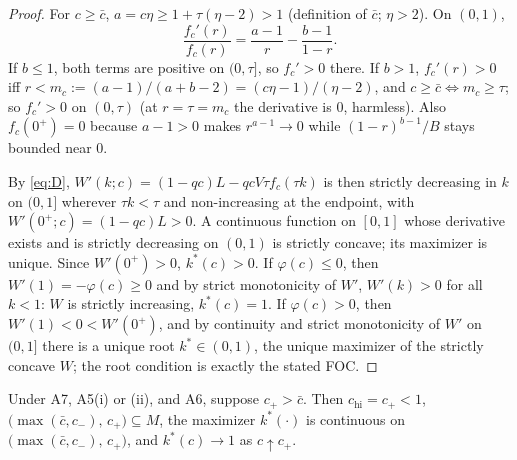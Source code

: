 \begin{proof}
For $c \ge \bar c$, $a = c\eta \ge 1 + \tau(\eta - 2) > 1$ (definition of $\bar c$;
$\eta > 2$). On $(0,1)$,
\[
\frac{f_c'(r)}{f_c(r)} = \frac{a - 1}{r} - \frac{b - 1}{1 - r}.
\]
If $b \le 1$, both terms are positive on $(0, \tau]$, so $f_c' > 0$ there. If $b > 1$,
$f_c'(r) > 0$ iff $r < m_c := (a - 1)/(a + b - 2) = (c\eta - 1)/(\eta - 2)$, and
$c \ge \bar c \iff m_c \ge \tau$; so $f_c' > 0$ on $(0, \tau)$ (at $r = \tau = m_c$ the
derivative is $0$, harmless). Also $f_c(0^+) = 0$ because $a - 1 > 0$ makes
$r^{a-1} \to 0$ while $(1 - r)^{b-1}/B$ stays bounded near $0$.

By \eqref{eq:D}, $W'(k; c) = (1 - qc)L - qcV\tau f_c(\tau k)$ is then strictly
decreasing in $k$ on $(0,1]$ wherever $\tau k < \tau$ and non-increasing at the
endpoint, with $W'(0^+; c) = (1 - qc)L > 0$. A continuous function on $[0,1]$ whose
derivative exists and is strictly decreasing on $(0,1)$ is strictly concave; its
maximizer is unique. Since $W'(0^+) > 0$, $k^*(c) > 0$. If $\varphi(c) \le 0$, then
$W'(1) = -\varphi(c) \ge 0$ and by strict monotonicity of $W'$, $W'(k) > 0$ for all
$k < 1$: $W$ is strictly increasing, $k^*(c) = 1$. If $\varphi(c) > 0$, then
$W'(1) < 0 < W'(0^+)$, and by continuity and strict monotonicity of $W'$ on $(0,1]$
there is a unique root $k^* \in (0,1)$, the unique maximizer of the strictly concave
$W$; the root condition is exactly the stated FOC.
\end{proof}

\begin{lemma}
\label{lem:upper}
Under A7, A5(i) or (ii), and A6, suppose $c_+ > \bar c$. Then
$c_{\mathrm{hi}} = c_+ < 1$, $\bigl( \max(\bar c, c_-),\, c_+ \bigr) \subseteq M$, the
maximizer $k^*(\cdot)$ is continuous on $\bigl( \max(\bar c, c_-),\, c_+ \bigr)$, and
$k^*(c) \to 1$ as $c \uparrow c_+$.
\end{lemma}

